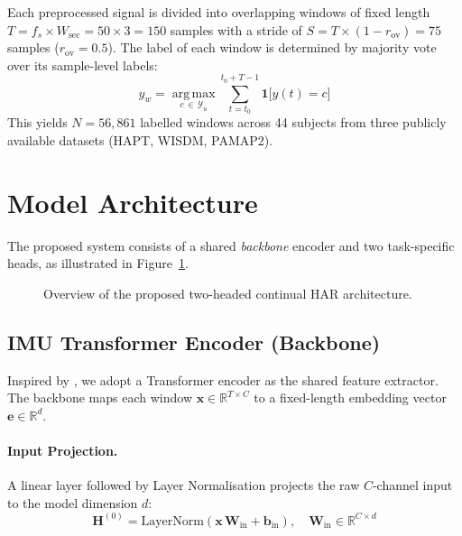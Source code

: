 Each preprocessed signal is divided into overlapping windows of fixed length
$T = f_s \times W_{\mathrm{sec}} = 50 \times 3 = 150$ samples with a stride
of $S = T \times (1 - r_{\mathrm{ov}}) = 75$ samples
($r_{\mathrm{ov}} = 0.5$).
The label of each window is determined by majority vote over its
sample-level labels:
\begin{equation}
    y_w = \operatorname*{arg\,max}_{c \,\in\, \mathcal{Y}_{u}}
          \sum_{t=t_0}^{t_0+T-1} \mathbf{1}\bigl[y(t) = c\bigr]
    \label{eq:window_label}
\end{equation}
This yields $N = 56{,}861$ labelled windows across 44 subjects from three
publicly available datasets (HAPT, WISDM, PAMAP2).


\section{Model Architecture}

The proposed system consists of a shared \emph{backbone} encoder and two
task-specific heads, as illustrated in Figure~\ref{fig:architecture}.

\begin{figure}[h]
\centering
{}
\caption{Overview of the proposed two-headed continual HAR architecture.}
\label{fig:architecture}
\end{figure}

\subsection{IMU Transformer Encoder (Backbone)}

Inspired by \cite{dirgova2022transformer}, we adopt a Transformer encoder
as the shared feature extractor. The backbone maps each window
$\mathbf{x} \in \mathbb{R}^{T \times C}$ to a fixed-length embedding
vector $\mathbf{e} \in \mathbb{R}^{d}$.

\paragraph{Input Projection.}
A linear layer followed by Layer Normalisation projects the raw $C$-channel
input to the model dimension $d$:
\begin{equation}
    \mathbf{H}^{(0)} = \mathrm{LayerNorm}\!\left(
        \mathbf{x}\,\mathbf{W}_{\mathrm{in}} + \mathbf{b}_{\mathrm{in}}
    \right), \quad
    \mathbf{W}_{\mathrm{in}} \in \mathbb{R}^{C \times d}
\end{equation}

